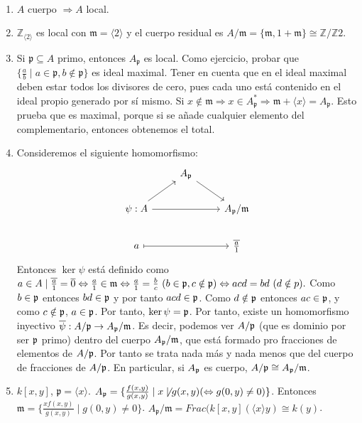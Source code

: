 \documentclass[ACGA.tex]{subfiles}
\begin{document}
\begin{ej}\
\begin{enumerate}
\item $A$ cuerpo $\Rightarrow A$ local. 
\item $\mathbb{Z}_{\langle 2\rangle}$ es local con $\mathfrak{m}=\langle 2\rangle$ y el cuerpo residual es $A/\mathfrak{m}=\{\mathfrak{m},1+\mathfrak{m}\}\cong\mathbb{Z}/\mathbb{Z}2$.
\item Si $\mathfrak{p}\subseteq A$ primo, entonces $A_{\mathfrak{p}}$ es local. Como ejercicio, probar que $\{\frac{a}{b}\mid a\in\mathfrak{p},b\notin\mathfrak{p}\}$ es ideal maximal. Tener en cuenta que en el ideal maximal deben estar todos los divisores de cero, pues cada uno está contenido en el ideal propio generado por sí mismo. Si $x\notin\mathfrak{m}\Rightarrow x\in A_\mathfrak{p}^*\Rightarrow \mathfrak{m}+\langle x\rangle =A_\mathfrak{p}$. Esto prueba que es maximal, porque si se añade cualquier elemento del complementario, entonces obtenemos el total.
\item Consideremos el siguiente homomorfismo:
\[
\begin{tikzcd}
& A_\p  \arrow[dr] & \\
\psi:A \arrow[ur]\arrow{rr} & & A_\p/\m\\
     a\arrow[rr, mapsto] & & \overline{\frac{a}{1}}
\end{tikzcd}
\]
Entonces $\ker{\psi}$ está definido como $a\in A\mid \overline{\frac{a}{1}}=\overline{0}\Leftrightarrow \frac{a}{1}\in{\mathfrak{m}}\Leftrightarrow\frac{a}{1}=\frac{b}{c}\ (b\in{\mathfrak{p}}, c\notin{\mathfrak{p}})\Leftrightarrow acd=bd\ (d\notin p).$ Como $b\in{\mathfrak{p}}$ entonces $bd\in{\mathfrak{p}}$ y por tanto $acd\in{\mathfrak{p}}$. Como $d\notin{\mathfrak{p}}$ entonces $ac\in{\mathfrak{p}}$, y como $c\notin{\mathfrak{p}}$, $a\in{\mathfrak{p}}$. Por tanto, $\ker{\psi}={\mathfrak{p}}$. Por tanto, existe un homomorfismo inyectivo $\overline{\psi}:A/{\mathfrak{p}}\to A_{\mathfrak{p}}/{\mathfrak{m}}$. Es decir, podemos ver $A/{\mathfrak{p}}$ (que es dominio por ser ${\mathfrak{p}}$ primo) dentro del cuerpo $A_{\mathfrak{p}}/{\mathfrak{m}}$, que está formado pro fracciones de elementos de $A/{\mathfrak{p}}$. Por tanto se trata nada más y nada menos que del cuerpo de fracciones de $A/{\mathfrak{p}}$. En particular, si $A_{\mathfrak{p}}$ es cuerpo, $A/{\mathfrak{p}}\cong A_{\mathfrak{p}}/{\mathfrak{m}}$.
\item $k[x,y]$, $\mathfrak{p}=\langle x\rangle$. $A_\mathfrak{p}=\{\frac{f(x,y)}{g(x,y)}\mid x\not\mid g(x,y)(\Leftrightarrow g(0,y)\neq 0)\}$. Entonces $\mathfrak{m}=\{\frac{xf(x,y)}{g(x,y)}\mid g(0,y)\neq 0\}$. $A_\mathfrak{p}/\mathfrak{m}=Frac(k[x,y](\langle x\rangle y)\cong k(y)$. 
\end{enumerate}
\end{ej}
\end{document}
